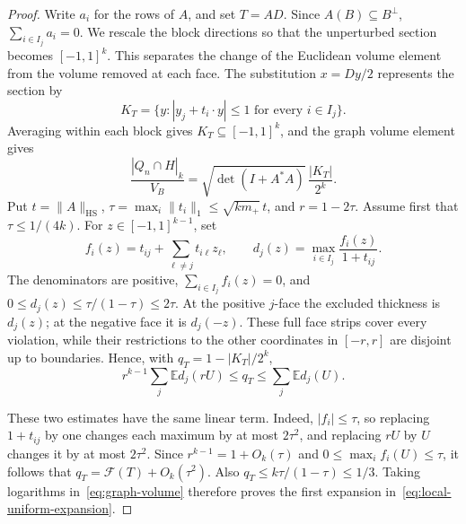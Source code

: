 \documentclass[11pt,a4paper]{article}
\theoremstyle{remark}\newtheorem{remark}[theorem]{Remark}
\numberwithin{equation}{section}
\begin{document}
\begin{proof}
Write \(a_i\) for the rows of \(A\), and set \(T=AD\).
Since \(A(B)\subseteq B^\perp\), \(\sum_{i\in I_j}a_i=0\).
We rescale the block directions so that the unperturbed section
becomes \([-1,1]^k\). This separates the change of the Euclidean
volume element from the volume removed at each face. The
substitution \(x=Dy/2\) represents the section by
\[
 K_T=\{y:|y_j+t_i\cdot y|\le1\text{ for every }i\in I_j\}.
\]
Averaging within each block gives \(K_T\subseteq[-1,1]^k\), and the
graph volume element gives
\begin{equation}\label{eq:graph-volume}
 \frac{|Q_n\cap H|_k}{V_B}
 =\sqrt{\det(I+A^*A)}\,\frac{|K_T|}{2^k}.
\end{equation}
Put \(t=\|A\|_{\mathrm{HS}}\), \(\tau=\max_i\|t_i\|_1
\le\sqrt{k m_+}\,t\), and \(r=1-2\tau\). Assume first that
\(\tau\le1/(4k)\). For \(z\in[-1,1]^{k-1}\), set
\[
 f_i(z)=t_{ij}+\sum_{\ell\ne j}t_{i\ell}z_\ell,\qquad
 d_j(z)=\max_{i\in I_j}\frac{f_i(z)}{1+t_{ij}}.
\]
The denominators are positive, \(\sum_{i\in I_j}f_i(z)=0\), and
\(0\le d_j(z)\le\tau/(1-\tau)\le2\tau\).
At the positive \(j\)-face the excluded thickness is \(d_j(z)\);
at the negative face it is \(d_j(-z)\). These full face strips cover
every violation, while their restrictions to the other coordinates
in \([-r,r]\) are disjoint up to boundaries. Hence, with
\(q_T=1-|K_T|/2^k\),
\[
 r^{k-1}\sum_j\mathbb E d_j(rU)
 \le q_T\le\sum_j\mathbb E d_j(U).
\]

These two estimates have the same linear term. Indeed,
\(|f_i|\le\tau\), so replacing \(1+t_{ij}\) by one changes each
maximum by at most \(2\tau^2\), and replacing \(rU\) by \(U\)
changes it by at most \(2\tau^2\). Since \(r^{k-1}=1+O_k(\tau)\)
and \(0\le\max_i f_i(U)\le\tau\), it follows that
\(q_T=\mathcal F(T)+O_k(\tau^2)\). Also \(q_T\le k\tau/(1-\tau)\le1/3\).
Taking logarithms in~\eqref{eq:graph-volume} therefore proves the
first expansion in~\eqref{eq:local-uniform-expansion}.


\end{proof}
\end{document}
